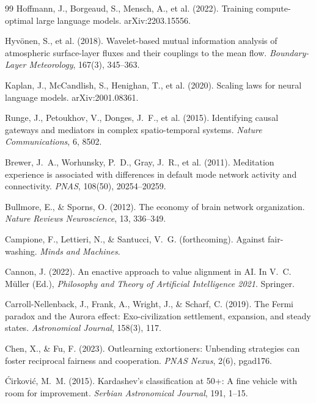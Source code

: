 \documentclass[11pt,a4paper,twocolumn]{article}
\begin{document}
\begin{thebibliography}{99}
 Hoffmann, J., Borgeaud, S., Mensch, A., et al. (2022). Training compute-optimal large language models. arXiv:2203.15556.

 Hyv\"{o}nen, S., et al. (2018). Wavelet-based mutual information analysis of atmospheric surface-layer fluxes and their couplings to the mean flow. \textit{Boundary-Layer Meteorology}, 167(3), 345--363.

 Kaplan, J., McCandlish, S., Henighan, T., et al. (2020). Scaling laws for neural language models. arXiv:2001.08361.

 Runge, J., Petoukhov, V., Donges, J.~F., et al. (2015). Identifying causal gateways and mediators in complex spatio-temporal systems. \textit{Nature Communications}, 6, 8502.

 Brewer, J.~A., Worhunsky, P.~D., Gray, J.~R., et al. (2011). Meditation experience is associated with differences in default mode network activity and connectivity. \textit{PNAS}, 108(50), 20254--20259.

 Bullmore, E., \& Sporns, O. (2012). The economy of brain network organization. \textit{Nature Reviews Neuroscience}, 13, 336--349.

 Campione, F., Lettieri, N., \& Santucci, V.~G. (forthcoming). Against fair-washing. \textit{Minds and Machines}.

 Cannon, J. (2022). An enactive approach to value alignment in AI. In V.~C. M\"uller (Ed.), \textit{Philosophy and Theory of Artificial Intelligence 2021}. Springer.

 Carroll-Nellenback, J., Frank, A., Wright, J., \& Scharf, C. (2019). The Fermi paradox and the Aurora effect: Exo-civilization settlement, expansion, and steady states. \textit{Astronomical Journal}, 158(3), 117.

 Chen, X., \& Fu, F. (2023). Outlearning extortioners: Unbending strategies can foster reciprocal fairness and cooperation. \textit{PNAS Nexus}, 2(6), pgad176.

 \'{C}irkovi\'{c}, M.~M. (2015). Kardashev's classification at 50+: A fine vehicle with room for improvement. \textit{Serbian Astronomical Journal}, 191, 1--15.


\end{thebibliography}
\end{document}
